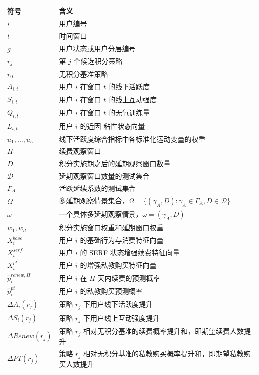 \documentclass[
  12pt,
]{ctexart}
\begin{document}
\begingroup
\small
\begin{longtable}[]{@{}
  >{\raggedright\arraybackslash}p{3.9cm}
  >{\raggedright\arraybackslash}p{11.2cm}@{}}
\toprule
符号 & 含义 \\
\midrule
\endhead
\(i\) & 用户编号 \\
\(t\) & 时间窗口 \\
\(g\) & 用户状态或用户分层编号 \\
\(r_j\) & 第 \(j\) 个候选积分策略 \\
\(r_0\) & 无积分基准策略 \\
\(A_{i,t}\) & 用户 \(i\) 在窗口 \(t\) 的线下活跃度 \\
\(S_{i,t}\) & 用户 \(i\) 在窗口 \(t\) 的线上互动强度 \\
\(Q_{i,t}\) & 用户 \(i\) 在窗口 \(t\) 的无氧训练量 \\
\(L_{i,t}\) & 用户 \(i\) 的近因-粘性状态向量 \\
\(u_1,\ldots,u_5\) & 线下活跃度综合指标中各标准化运动变量的权重 \\
\(H\) & 续费观察窗口 \\
\(D\) & 积分实施期之后的延期观察窗口数量 \\
\(\mathcal{D}\) & 延期观察窗口数量的测试集合 \\
\(\Gamma_A\) & 活跃延续系数的测试集合 \\
\(\Omega\) & 多延期观察情景集合，\(\Omega=\{(\gamma_A,D):\gamma_A\in\Gamma_A,D\in\mathcal{D}\}\) \\
\(\omega\) & 一个具体多延期观察情景，\(\omega=(\gamma_A,D)\) \\
\(w_1,w_d\) & 积分实施窗口权重和延期窗口权重 \\
\(X_i^{base}\) & 用户 \(i\) 的基础行为与消费特征向量 \\
\(X_i^{serf}\) & 用户 \(i\) 的 SERF 状态增强续费特征向量 \\
\(X_i^{pt}\) & 用户 \(i\) 的增强私教购买特征向量 \\
\(\hat p_i^{renew,H}\) & 用户 \(i\) 在 \(H\) 天内续费的预测概率 \\
\(\hat p_i^{pt}\) & 用户 \(i\) 的私教购买预测概率 \\
\(\Delta A_i(r_j)\) & 策略 \(r_j\) 下用户线下活跃度提升 \\
\(\Delta S_i(r_j)\) & 策略 \(r_j\) 下用户线上互动强度提升 \\
\(\Delta Renew(r_j)\) & 策略 \(r_j\) 相对无积分基准的续费概率提升和，即期望续费人数提升 \\
\(\Delta PT(r_j)\) & 策略 \(r_j\) 相对无积分基准的私教购买概率提升和，即期望私教购买人数提升 \\

\end{longtable}
\end{document}

